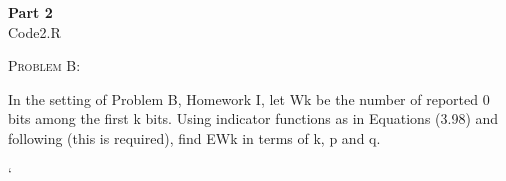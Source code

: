 \documentclass[12pt]{article}
\newenvironment{statement}[1]
{\begin{mdframed}[linewidth=0.6pt]
        \textsc{ #1:}

}
    {\end{mdframed}}
\begin{document}
\textbf{Part 2 }\\
Code2.R
\newpage
\begin{statement}{Problem B}
In the setting of Problem B, Homework I, let Wk be the number of reported 0 bits among the first k bits. Using indicator functions as in Equations (3.98) and following (this is required), find EWk in terms of k, p and q.
\end{statement}





`
\end{document}
